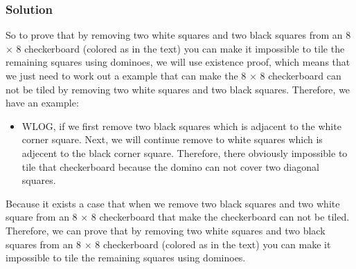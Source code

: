 \documentclass{article}
\begin{document}
\subsubsection*{Solution}
\begin{center}
\end{center}
So to prove that by removing two white squares and two black squares from an 
8 \(\times\) 8 checkerboard (colored as in the text) you can make it 
impossible to tile the remaining squares using dominoes, we will use existence
proof, which means that we just need to work out a example that can make
the 8 \(\times\) 8 checkerboard can not be tiled by removing two white squares and
two black squares. Therefore, we have an example:
\begin{itemize}
    \item WLOG, if we first remove two black squares which is adjacent to the white
    corner square. Next, we will continue remove to white squares which is adjecent to
    the black corner square. Therefore, there obviously impossible to tile that checkerboard
    because the domino can not cover two diagonal squares.
\end{itemize}
Because it exists a case that when we remove two black squares and two white square
from an 8 \(\times\) 8 checkerboard that make the checkerboard can not be tiled.
Therefore, we can prove that by removing two white squares and two black squares from an 
8 \(\times\) 8 checkerboard (colored as in the text) you can make it 
impossible to tile the remaining squares using dominoes.
\end{document}
